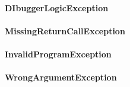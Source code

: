 \documentclass[parskip=full]{scrartcl}
\begin{document}
\paragraph{DIbuggerLogicException}
\paragraph{MissingReturnCallException}
\paragraph{InvalidProgramException}
\paragraph{WrongArgumentException}
\end{document}
